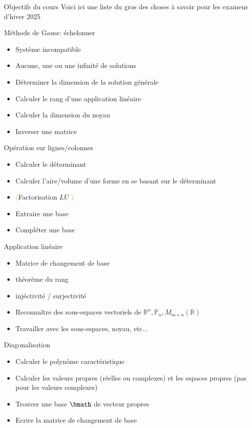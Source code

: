 \begin{parag}{Objectifs du cours}
    Voici ici une liste du gros des choses à savoir pour les examens d'hiver 2025
\end{parag}
\begin{parag}{Méthode de Gauss: échelonner}
    \begin{itemize}
        \item Système incompatible
        \item Aucune, une ou une infinité de solutions
        \item Déterminer la dimension de la solution générale
        \item Calculer le rang d'une application linéaire
        \item Calculer la dimension du noyau
        \item Inverser une matrice
    \end{itemize}
\end{parag}
\begin{parag}{Opération sur lignes/colonnes}
    \begin{itemize}
        \item Calculer le déterminant
        \item Calculer l'aire/volume d'une forme en se basant sur le déterminant
        \item \textcolor{orange}{(}Factorisation $LU$ \textcolor{orange}{)}
        \item Extraire une base
        \item Compléter une base
    \end{itemize}
\end{parag}
\begin{parag}{Application linéaire}
    \begin{itemize}
        \item Matrice de changement de base
        \item  théorème du rang
        \item injéctivité / surjectivité
        \item Reconnaître des sous-espaces vectoriels de $\mathbb{R}^n, \mathbb{P}_n, M_{m \times n}(\mathbb{R})$
        \item Travailler avec les sous-espaces, noyau, etc$\dots$
    \end{itemize}
\end{parag}
\begin{parag}{Diagonalisation}
    \begin{itemize}
        \item Calculer le polynôme caractéristique
        \item Calculer les valeurs propres (réelles ou complexes) et les espaces propres (pas pour les valeurs complexes)
        \item Trouver une base $\bmath$ de vecteur propres
        \item Ecrire la matrice de changement de base
    \end{itemize}
\end{parag}
